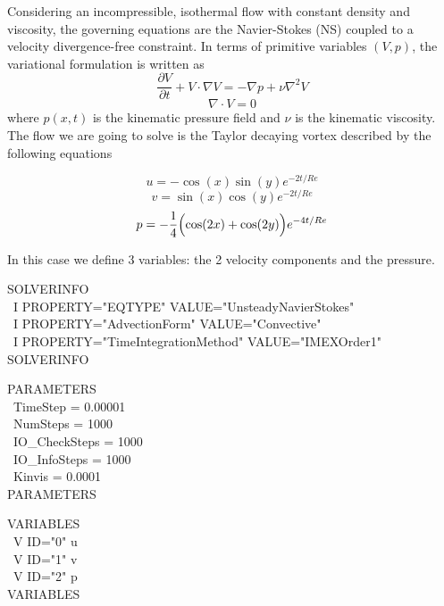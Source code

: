 \documentclass[12pt]{article}
\begin{document}
\noindent
Considering an incompressible, isothermal flow with constant density and viscosity, the governing equations are the Navier-Stokes (NS) coupled to a velocity divergence-free constraint. In terms of primitive variables $(V,p)$, the variational formulation is written as
\begin{equation}
\frac{\partial V}{\partial t} + V \cdot  \nabla V = -\nabla p + \nu \nabla^2 V
\label{eq:NS1}
\end{equation}
\begin{equation}
\nabla \cdot V = 0
\label{eq:NSequation}
\end{equation}
where $p(x,t)$ is the kinematic pressure field and $\nu$ is the kinematic viscosity. The flow we are going to solve is the Taylor decaying vortex described by the following equations

\begin{equation}
u=-\cos(x)\sin(y)e^{-2t/Re}
\label{eq:Dec1}
\end{equation}
\begin{equation}
v=\sin(x)\cos(y)e^{-2t/Re}
\label{eq:Dec2}
\end{equation}
\begin{equation}
p=-\frac{1}{4}\Bigl(\cos(2x)+\cos(2y)\Bigr)e^{-4t/Re}
\label{eq:Dec3}
\end{equation}

\noindent
In this case we define 3 variables: the 2 velocity components and the pressure.

\begin{algorithm2e}[H]
    SOLVERINFO\\\
        I PROPERTY="EQTYPE" VALUE="UnsteadyNavierStokes"\\\
        I PROPERTY="AdvectionForm" VALUE="Convective"\\\
        I PROPERTY="TimeIntegrationMethod" VALUE="IMEXOrder1"\\
      SOLVERINFO
\end{algorithm2e}
\begin{algorithm2e}[H]
    PARAMETERS\\\
     TimeStep      = 0.00001\\\               
      NumSteps      = 1000 \\\                 
      IO\_CheckSteps = 1000\\\                  
      IO\_InfoSteps  = 1000\\\                 
      Kinvis        = 0.0001\\            
    PARAMETERS\\
  \end{algorithm2e}
   \begin{algorithm2e}[H]
    VARIABLES\\\
      V ID="0" u\\\  
      V ID="1" v\\\  
      V ID="2" p\\ 
    VARIABLES\\
  \end{algorithm2e}
\end{document}
